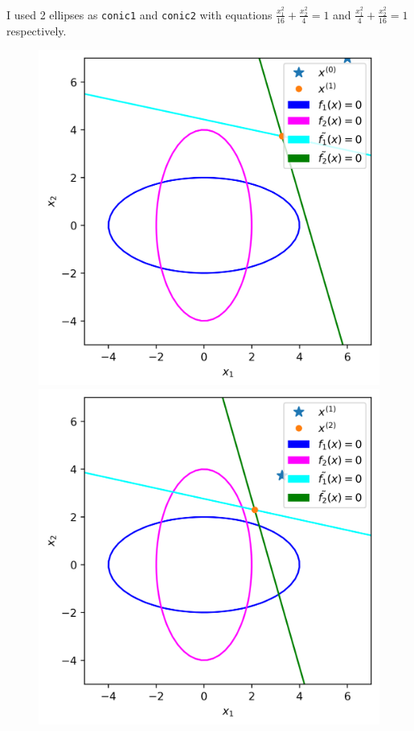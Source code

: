 \documentclass{article}
\begin{document}
\begin{enumerate}
    I used 2 ellipses as \texttt{conic1} and \texttt{conic2} with equations $\frac{x_1^2}{16} + \frac{x_2^2}{4} = 1$ and $\frac{x_1^2}{4} + \frac{x_2^2}{16} = 1$ respectively.
    \begin{figure}[!ht]
    \centering
    \includegraphics[scale=0.5]{fig0.png}
    \includegraphics[scale=0.5]{fig1.png}

\end{figure}
\end{enumerate}
\end{document}
